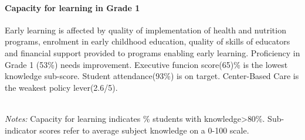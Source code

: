 \documentclass[
  twocolumn]{article}
\begin{document}
\hypertarget{capacity-for-learning-in-grade-1}{%
\paragraph{\texorpdfstring{\textbf{Capacity for learning in Grade
1}}{Capacity for learning in Grade 1}}\label{capacity-for-learning-in-grade-1}}

Early learning is affected by quality of implementation of health and
nutrition programs, enrolment in early childhood education, quality of
skills of educators and financial support provided to programs enabling
early learning. Proficiency in Grade 1 (53\%) needs improvement.
Executive funcion score(65)\% is the lowest knowledge sub-score. Student
attendance(93\%) is on target. Center-Based Care is the weakest policy
lever(2.6/5).

\begin{table}[H]
\\
\color{darkgray}\scriptsize{\textit{Notes:} Capacity for learning indicates \% students with knowledge\textgreater{80\%}. Sub-indicator scores refer to average subject knowledge on a 0-100 scale.}
\end{table}
\raggedbottom
\end{document}
